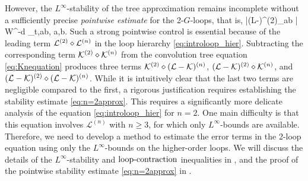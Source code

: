 
However, the \( L^\infty \)-stability of the tree approximation remains incomplete without a sufficiently precise \emph{pointwise estimate}  for the 2-$G$-loops, that is,  
\be\label{eq:n=2approx}
\left|\left({\cal L}-\cK\right)^{(2)}_{ab} \right| \ll W^{-d} \Theta_{t,ab}, \quad  \forall a,b\in \Zn.
\ee
Such a strong pointwise control is essential because of the leading term $\cal L^{(2)}\diamond \cal L^{(n)}$ in the loop hierarchy \eqref{eq:introloop_hier}. Subtracting the corresponding term $\cal K^{(2)}\diamond \cal K^{(n)}$ from the convolution tree equation \eqref{eq:Knequation} produces three terms $\cal K^{(2)}\diamond (\cal L-\cal K)^{(n)}$, $(\cal L-\cal K)^{(2)}\diamond \cal K^{(n)}$, and $(\cal L-\cal K)^{(2)}\diamond (\cal L-\cal K)^{(n)}$. While it is intuitively clear that the last two terms are negligible compared to the first, a rigorous justification requires establishing the stability estimate \eqref{eq:n=2approx}. 
This requires a significantly more delicate analysis of the equation \eqref{eq:introloop_hier} for $n=2$.  
One main difficulty is that this equation involves \( \mathcal{L}^{(n)} \) with \( n \geq 3 \), for which only \( L^\infty \)-bounds are available. Therefore, we need to develop a method to estimate the error terms in the 2-loop equation using only the \( L^\infty \)-bounds on the higher-order loops. 
We will discuss the details of the $L^\infty$-stability and $\contract$ inequalities in , and the proof of the pointwise stability estimate \eqref{eq:n=2approx} in .



